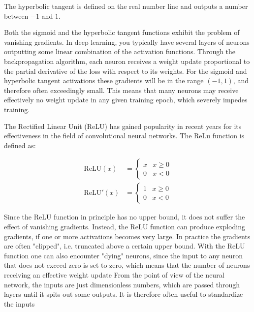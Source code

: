 The hyperbolic tangent is defined on the real number line and outputs
a number between $-1$ and $1$.
\par
Both the sigmoid and the hyperbolic tangent functions exhibit the problem
of vanishing gradients. In deep learning, you typically have several layers
of neurons outputting some linear combination of the activation functions.
Through the backpropagation algorithm, each neuron receives a weight update
proportional to the partial derivative of the loss with respect to
its weights. For the sigmoid and hyperbolic tangent activations these
gradients will be in the range $(-1, 1)$, and therefore often
exceedingly small. This means that many neurons may receive effectively
no weight update in any given training epoch, which severely impedes training.
\par
The Rectified Linear Unit (ReLU) has gained popularity in recent years
for its effectiveness in the field of convolutional neural networks.
The ReLu function is defined as:

\begin{equation}
    \begin{split}
        \text{ReLU}(x) &=
    \begin{cases}
        x & x \geq 0 \\
        0 & x < 0
    \end{cases} \\
        \text{ReLU}'(x) &=
    \begin{cases}
        1 & x \geq 0 \\
        0 & x < 0
    \end{cases}
    \end{split}
\end{equation}

Since the ReLU function in principle has no upper bound, it does
not suffer the effect of vanishing gradients. Instead, the ReLU function
can produce exploding gradients, if one or more activations becomes
very large. In practice the gradients are often "clipped", i.e.
truncated above a certain upper bound.
With the ReLU function one can also encounter "dying" neurons,
since the input to any neuron that does not exceed zero
is set to zero, which means that the number of neurons receiving
an effective weight update
\newline
\newline
From the point of view of the neural network, the inputs are just
dimensionless numbers, which are passed through layers until it spits
out some outputs. It is therefore often useful to standardize the inputs
